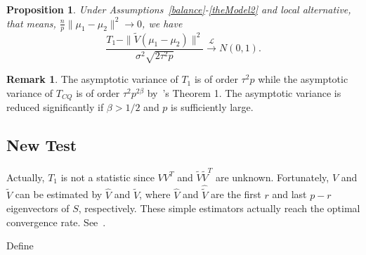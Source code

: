 \documentclass[review]{elsarticle}
\theoremstyle{plain}
\newtheorem{proposition}{\quad\quad Proposition}
\theoremstyle{definition}
\newtheorem{remark}{\quad\quad Remark}
\theoremstyle{remark}
\begin{document}
\begin{proposition}\label{oracleTheorem}
    Under Assumptions~\ref{balance}-\ref{theModel2} and local alternative, that means, $\frac{n}{p}\|\mu_1-\mu_2\|^2\to 0$, we have 
    \begin{equation*}
        \frac{T_1-\|\tilde{V}(\mu_1-\mu_2)\|^2}
        {\sigma^2\sqrt{2\tau^2 p}}\xrightarrow{\mathcal{L}}N(0,1).
    \end{equation*}
\end{proposition}

\begin{remark}
    The asymptotic variance of $T_1$ is of order $\tau^2 p$ while the asymptotic variance of $T_{CQ}$ is of order $\tau^2 p^{2\beta}$ by~\cite{Chen2010A}'s Theorem 1. The asymptotic variance is reduced significantly if $\beta>1/2$ and $p$ is sufficiently large.
\end{remark}




\subsection{New Test}

Actually, $T_1$ is not a statistic since $VV^T$ and $\tilde{V}\tilde{V}^T$ are unknown. Fortunately, $V$ and $\tilde{V}$ can be estimated by $\hat{V}$ and $\hat{\tilde{V}}$, where $\hat{V}$ and $\hat{\tilde{V}}$ are the first $r$ and last $p-r$ eigenvectors of $S$, respectively. These simple estimators actually reach the optimal convergence rate. See~\cite{Cai2012Sparse}.

Define
\end{document}
